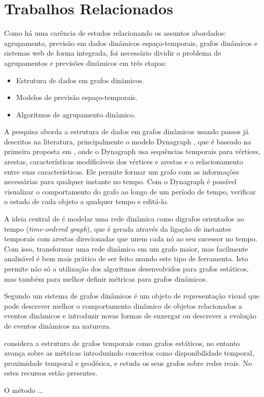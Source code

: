 \section{Trabalhos Relacionados}
\label{chap:trabalhos-relacionados}

Como há uma carência de estudos relacionando os assuntos abordados: agrupamento, previsão em dados dinâmicos espaço-temporais, grafos dinâmicos e sistemas web de forma integrada, foi necessário dividir o problema de agrupamentos e previsões dinâmicos em três etapas:
\begin{itemize}
\item Estrutura de dados em grafos dinâmicos.
\item Modelos de previsão espaço-temporais.
\item Algoritmos de agrupamento dinâmico.
\end{itemize}

A pesquisa aborda a estrutura de dados em grafos dinâmicos usando passos já descritos na literatura, principalmente o modelo Dynagraph \cite{dynagraph}, que é baseado na primeira proposta em \cite{dynagraph2012}, onde o Dynagraph usa sequências temporais para vértices, arestas, características modificáveis dos vértices e arestas e o relacionamento entre suas características. Ele permite formar um grafo com as informações necessárias para qualquer instante no tempo. Com o Dynagraph é possível visualizar o comportamento do grafo ao longo de um período de tempo, verificar o estado de cada objeto a qualquer tempo e editá-lo.

A ideia central de \cite{kim} é modelar uma rede dinâmica como digrafos orientados ao tempo (\textit{time-ordered graph}), que é gerada através da ligação de instantes temporais com arestas direcionadas que unem cada nó ao seu sucessor no tempo. Com isso, transformar uma rede dinâmica em um grafo maior, mas facilmente analisável é bem mais prático de ser feito usando este tipo de ferramenta. Isto permite não só a utilização dos algoritmos 
desenvolvidos para grafos estáticos, mas também para melhor definir métricas para grafos dinâmicos. 

Segundo \cite{kim} um sistema de grafos dinâmicos é um objeto de representação visual que pode descrever melhor o comportamento dinâmico de objetos relacionados a eventos dinâmicos e introduzir novas formas de enxergar ou descrever a evolução de eventos dinâmicos na natureza.

\cite{kostakos} considera a estrutura de grafos temporais como grafos
estáticos, no entanto avança sobre as métricas introduzindo conceitos como disponibilidade temporal, proximidade temporal e geodésica, e estuda os seus grafos sobre redes reais. No \cite{dynagraph} estes recursos estão presentes.

O método ...\cite{ign}